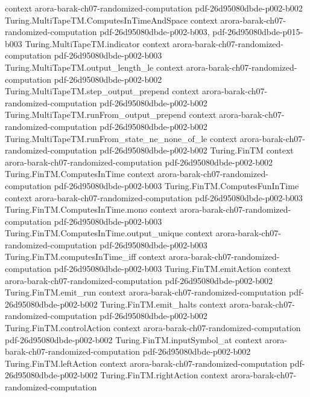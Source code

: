 \begin{theorem}
  {context}
  {arora-barak-ch07-randomized-computation}
  {pdf-26d95080dbde-p002-b002}
\proofstep
  {Turing.MultiTapeTM.ComputesInTimeAndSpace}
  {context}
  {arora-barak-ch07-randomized-computation}
  {pdf-26d95080dbde-p002-b003,
    pdf-26d95080dbde-p015-b003}
\proofstep
  {Turing.MultiTapeTM.indicator}
  {context}
  {arora-barak-ch07-randomized-computation}
  {pdf-26d95080dbde-p002-b003}
\proofstep
  {Turing.MultiTapeTM.output_length_le}
  {context}
  {arora-barak-ch07-randomized-computation}
  {pdf-26d95080dbde-p002-b002}
\proofstep
  {Turing.MultiTapeTM.step_output_prepend}
  {context}
  {arora-barak-ch07-randomized-computation}
  {pdf-26d95080dbde-p002-b002}
\proofstep
  {Turing.MultiTapeTM.runFrom_output_prepend}
  {context}
  {arora-barak-ch07-randomized-computation}
  {pdf-26d95080dbde-p002-b002}
\proofstep
  {Turing.MultiTapeTM.runFrom_state_ne_none_of_le}
  {context}
  {arora-barak-ch07-randomized-computation}
  {pdf-26d95080dbde-p002-b002}
\proofstep
  {Turing.FinTM}
  {context}
  {arora-barak-ch07-randomized-computation}
  {pdf-26d95080dbde-p002-b002}
\proofstep
  {Turing.FinTM.ComputesInTime}
  {context}
  {arora-barak-ch07-randomized-computation}
  {pdf-26d95080dbde-p002-b003}
\proofstep
  {Turing.FinTM.ComputesFunInTime}
  {context}
  {arora-barak-ch07-randomized-computation}
  {pdf-26d95080dbde-p002-b003}
\proofstep
  {Turing.FinTM.ComputesInTime.mono}
  {context}
  {arora-barak-ch07-randomized-computation}
  {pdf-26d95080dbde-p002-b003}
\proofstep
  {Turing.FinTM.ComputesInTime.output_unique}
  {context}
  {arora-barak-ch07-randomized-computation}
  {pdf-26d95080dbde-p002-b003}
\proofstep
  {Turing.FinTM.computesInTime_iff}
  {context}
  {arora-barak-ch07-randomized-computation}
  {pdf-26d95080dbde-p002-b003}
\proofstep
  {Turing.FinTM.emitAction}
  {context}
  {arora-barak-ch07-randomized-computation}
  {pdf-26d95080dbde-p002-b002}
\proofstep
  {Turing.FinTM.emit_run}
  {context}
  {arora-barak-ch07-randomized-computation}
  {pdf-26d95080dbde-p002-b002}
\proofstep
  {Turing.FinTM.emit_halts}
  {context}
  {arora-barak-ch07-randomized-computation}
  {pdf-26d95080dbde-p002-b002}
\proofstep
  {Turing.FinTM.controlAction}
  {context}
  {arora-barak-ch07-randomized-computation}
  {pdf-26d95080dbde-p002-b002}
\proofstep
  {Turing.FinTM.inputSymbol_at}
  {context}
  {arora-barak-ch07-randomized-computation}
  {pdf-26d95080dbde-p002-b002}
\proofstep
  {Turing.FinTM.leftAction}
  {context}
  {arora-barak-ch07-randomized-computation}
  {pdf-26d95080dbde-p002-b002}
\proofstep
  {Turing.FinTM.rightAction}
  {context}
  {arora-barak-ch07-randomized-computation}

\end{theorem}
